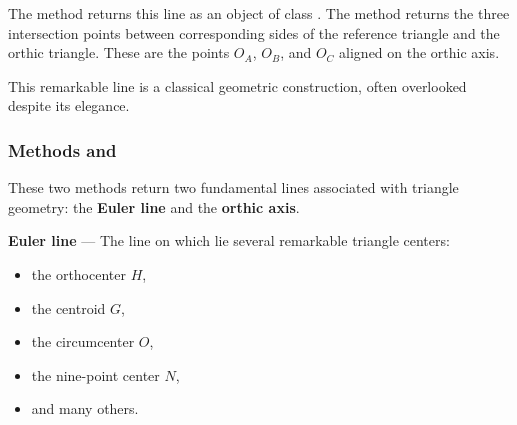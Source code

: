 \medskip

The method  returns this line as an object of class .
The method  returns the three intersection points between corresponding sides of the reference triangle and the orthic triangle. These are the points $O_A$, $O_B$, and $O_C$ aligned on the orthic axis.

\medskip

This remarkable line is a classical geometric construction, often overlooked despite its elegance.

\vspace{1em}

\begin{tkzexample}[latex=.5\textwidth]
\begin{center}
\end{center}
\end{tkzexample}


\subsubsection{Methods  and } %
\label{ssub:euler_line}

These two methods return two fundamental lines associated with triangle geometry: the \textbf{Euler line} and the \textbf{orthic axis}.

\medskip

\textbf{Euler line} — The line on which lie several remarkable triangle centers:
\begin{itemize}
  \item the orthocenter $H$,
  \item the centroid $G$,
  \item the circumcenter $O$,
  \item the nine-point center $N$,
  \item and many others.
\end{itemize}



